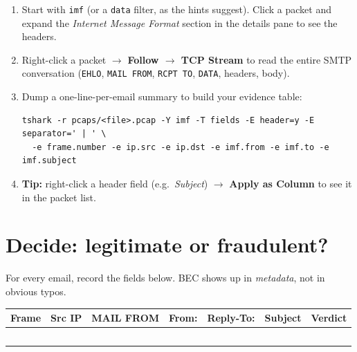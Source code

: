\documentclass[11pt]{article}
\begin{document}
\begin{enumerate}[label=\textbf{3.\arabic*}]
  \item Start with \texttt{imf} (or a \texttt{data} filter, as the hints suggest). Click a packet and expand the
        \emph{Internet Message Format} section in the details pane to see the headers.
  \item Right-click a packet $\rightarrow$ \textbf{Follow $\rightarrow$ TCP Stream} to read the entire SMTP
        conversation (\texttt{EHLO}, \texttt{MAIL FROM}, \texttt{RCPT TO}, \texttt{DATA}, headers, body).
  \item Dump a one-line-per-email summary to build your evidence table:
\begin{lstlisting}
tshark -r pcaps/<file>.pcap -Y imf -T fields -E header=y -E separator=' | ' \
  -e frame.number -e ip.src -e ip.dst -e imf.from -e imf.to -e imf.subject
\end{lstlisting}
  \item \textbf{Tip:} right-click a header field (e.g.\ \emph{Subject}) $\rightarrow$ \textbf{Apply as Column}
        to see it in the packet list.
\end{enumerate}

\section{Decide: legitimate or fraudulent?}
For every email, record the fields below. BEC shows up in \emph{metadata}, not in obvious typos.

\begin{center}
\small
\begin{tabular}{@{}lllllll@{}}
\toprule
\textbf{Frame} & \textbf{Src IP} & \textbf{MAIL FROM} & \textbf{From:} & \textbf{Reply-To:} & \textbf{Subject} & \textbf{Verdict} \\
\midrule
\rule{0pt}{14pt} & & & & & & \\
\rule{0pt}{14pt} & & & & & & \\
\rule{0pt}{14pt} & & & & & & \\
\rule{0pt}{14pt} & & & & & & \\
\rule{0pt}{14pt} & & & & & & \\
\bottomrule
\end{tabular}
\end{center}
\end{document}
